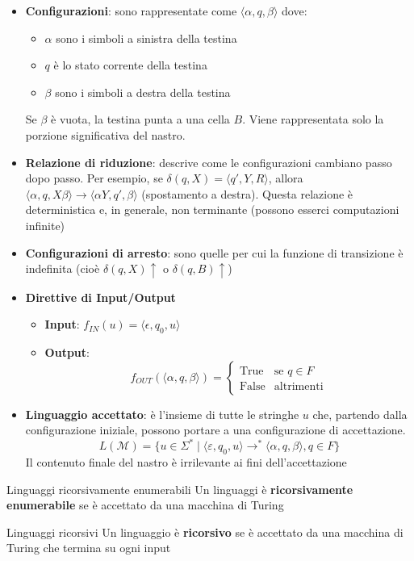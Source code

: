 \documentclass[12pt, a4paper]{report}
\begin{document}
            \begin{itemize}
                \item \textbf{Configurazioni}: sono rappresentate come $\langle \alpha, q, \beta \rangle$ dove: \begin{itemize}
                    \item $\alpha$ sono i simboli a sinistra della testina
                    \item $q$ è lo stato corrente della testina
                    \item $\beta$ sono i simboli a destra della testina
                \end{itemize}
                Se $\beta$ è vuota, la testina punta a una cella $B$. Viene rappresentata solo la porzione significativa del nastro.
                \item \textbf{Relazione di riduzione}: descrive come le configurazioni cambiano passo dopo passo. Per esempio, se $\delta(q, X) = \langle q', Y, R \rangle$, allora $\langle \alpha, q, X\beta \rangle \to \langle \alpha Y, q', \beta \rangle$ (spostamento a destra). Questa relazione è deterministica e, in generale, non terminante (possono esserci computazioni infinite)
                \item \textbf{Configurazioni di arresto}: sono quelle per cui la funzione di transizione è indefinita (cioè $\delta(q, X)\uparrow$ o $\delta(q, B)\uparrow$)
                \item \textbf{Direttive di Input/Output} \begin{itemize}
                    \item \textbf{Input}: $f_{IN}(u) = \langle \epsilon, q_0, u \rangle$
                    \item \textbf{Output}: $$f_{OUT}(\langle \alpha, q, \beta \rangle)=\begin{cases}
                        \text{True} & \text{se } q\in F\\
                        \text{False} & \text{altrimenti}
                    \end{cases}$$
                \end{itemize}
                \item \textbf{Linguaggio accettato}: è l'insieme di tutte le stringhe $u$ che, partendo dalla configurazione iniziale, possono portare a una configurazione di accettazione. $$L(\mathcal{M}) = \{u \in \Sigma^* \mid \langle \varepsilon, q_0, u \rangle \to^* \langle \alpha, q, \beta \rangle, q \in F\}$$ Il contenuto finale del nastro è irrilevante ai fini dell'accettazione
            \end{itemize}
            \begin{definitionbox}{Linguaggi ricorsivamente enumerabili}{}
                Un linguaggi è \textbf{ricorsivamente enumerabile} se è accettato da una macchina di Turing
            \end{definitionbox}
            \begin{definitionbox}{Linguaggi ricorsivi}{}
                Un linguaggio è \textbf{ricorsivo} se è accettato da una macchina di Turing che termina su ogni input
            \end{definitionbox}
\end{document}
